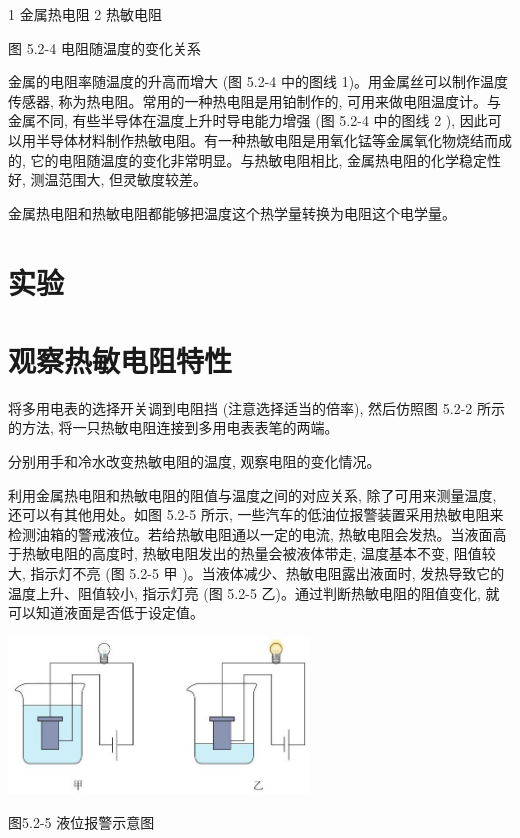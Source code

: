 \documentclass[10pt]{article}
\begin{document}
1 金属热电阻 2 热敏电阻

图 5.2-4 电阻随温度的变化关系

金属的电阻率随温度的升高而增大 (图 5.2-4 中的图线 1)。用金属丝可以制作温度传感器, 称为热电阻。常用的一种热电阻是用铂制作的, 可用来做电阻温度计。与金属不同, 有些半导体在温度上升时导电能力增强 (图 5.2-4 中的图线 2 ), 因此可以用半导体材料制作热敏电阻。有一种热敏电阻是用氧化锰等金属氧化物烧结而成的, 它的电阻随温度的变化非常明显。与热敏电阻相比, 金属热电阻的化学稳定性好, 测温范围大, 但灵敏度较差。

金属热电阻和热敏电阻都能够把温度这个热学量转换为电阻这个电学量。

\section*{实验}

\section*{观察热敏电阻特性}

将多用电表的选择开关调到电阻挡 (注意选择适当的倍率), 然后仿照图 5.2-2 所示的方法, 将一只热敏电阻连接到多用电表表笔的两端。

分别用手和冷水改变热敏电阻的温度, 观察电阻的变化情况。

利用金属热电阻和热敏电阻的阻值与温度之间的对应关系, 除了可用来测量温度, 还可以有其他用处。如图 5.2-5 所示, 一些汽车的低油位报警装置采用热敏电阻来检测油箱的警戒液位。若给热敏电阻通以一定的电流, 热敏电阻会发热。当液面高于热敏电阻的高度时, 热敏电阻发出的热量会被液体带走, 温度基本不变, 阻值较大, 指示灯不亮 (图 5.2-5 甲 )。当液体减少、热敏电阻露出液面时, 发热导致它的温度上升、阻值较小, 指示灯亮 (图 5.2-5 乙)。通过判断热敏电阻的阻值变化, 就可以知道液面是否低于设定值。

\begin{center}
\includegraphics[max width=0.6\textwidth]{images/01910e72-c5b7-7ed5-a6d4-fb3a5faefc32_104_595914.jpg}
\end{center}

图5.2-5 液位报警示意图
\end{document}
